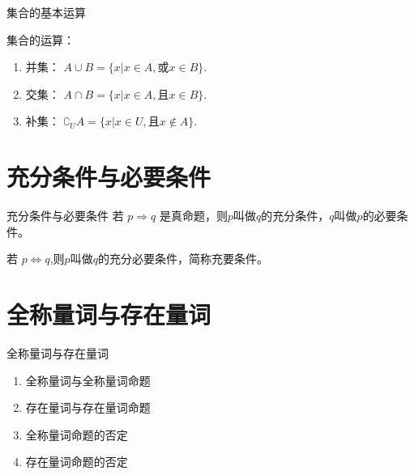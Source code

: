 \documentclass[10pt,
	aspectratio=169,%
	hyperref={colorlinks,
		citecolor=peking_blue,
		urlcolor=peking_blue,
		linkcolor=},
	t,%
	]{beamer}
\theoremstyle{plain}
\begin{document}
\begin{frame}{集合的基本运算}
	
	集合的运算：
	\begin{enumerate}
		\item 并集： $A \cup B = \{ x | x \in A,\text{或} x \in B\}$.
		\item 交集： $A \cap B = \{ x | x \in A ,\text{且} x \in B \}$.
		\item 补集： $\complement_UA = \{ x | x \in U, \text{且} x \notin A\}$.
	\end{enumerate}

\end{frame}

%

\section{充分条件与必要条件}

\begin{frame}{充分条件与必要条件}
	若 $p \Rightarrow q$ 是真命题，则$p$叫做$q$的充分条件，$q$叫做$p$的必要条件。
	
	若 $p \Leftrightarrow q$,则$p$叫做$q$的充分必要条件，简称充要条件。

\end{frame}



\section{全称量词与存在量词}

\begin{frame}{全称量词与存在量词}

\begin{enumerate}
	\item 全称量词与全称量词命题
	\item 存在量词与存在量词命题
	\item 全称量词命题的否定
	\item 存在量词命题的否定
\end{enumerate}

    
\end{frame}
\end{document}
